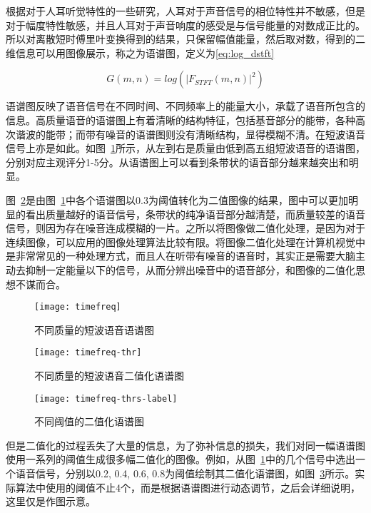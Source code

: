 根据对于人耳听觉特性的一些研究，人耳对于声音信号的相位特性并不敏感，但是对于幅度特性敏感，并且人耳对于声音响度的感受是与信号能量的对数成正比的。所以对离散短时傅里叶变换得到的结果，只保留幅值能量，然后取对数，得到的二维信息可以用图像展示，称之为语谱图，定义为\ref{eq:log_dstft}

\begin{equation}\label{eq:log_dstft}
G(m, n) = log(|F_{STFT}(m, n)|^2)
\end{equation}

语谱图反映了语音信号在不同时间、不同频率上的能量大小，承载了语音所包含的信息。高质量语音的语谱图上有着清晰的结构特征，包括基音部分的能带，各种高次谐波的能带；而带有噪音的语谱图则没有清晰结构，显得模糊不清。在短波语音信号上亦是如此。如图~\ref{fig:timefreq}所示，从左到右是质量由低到高五组短波语音的语谱图，分别对应主观评分1-5分。从语谱图上可以看到条带状的语音部分越来越突出和明显。

图~\ref{fig:timefreq-thr0.3}是由图~\ref{fig:timefreq}中各个语谱图以0.3为阈值转化为二值图像的结果，图中可以更加明显的看出质量越好的语音信号，条带状的纯净语音部分越清楚，而质量较差的语音信号，则因为存在噪音连成模糊的一片。之所以将图像做二值化处理，是因为对于连续图像，可以应用的图像处理算法比较有限。将图像二值化处理在计算机视觉中是非常常见的一种处理方式，而且人在听带有噪音的语音时，其实正是需要大脑主动去抑制一定能量以下的信号，从而分辨出噪音中的语音部分，和图像的二值化思想不谋而合。

\begin{figure}
\centering
\texttt{[image: timefreq]}
\caption{不同质量的短波语音语谱图\label{fig:timefreq}}
\end{figure}

\begin{figure}
\centering
\texttt{[image: timefreq-thr]}
\caption{不同质量的短波语音二值化语谱图\label{fig:timefreq-thr0.3}}
\end{figure}

\begin{figure}
\centering
\texttt{[image: timefreq-thrs-label]}
\caption{不同阈值的二值化语谱图\label{fig:timefreq-thrs-label}}
\end{figure}

但是二值化的过程丢失了大量的信息，为了弥补信息的损失，我们对同一幅语谱图使用一系列的阈值生成很多幅二值化的图像。例如，从图~\ref{fig:timefreq}中的几个信号中选出一个语音信号，分别以0.2, 0.4, 0.6, 0.8为阈值绘制其二值化语谱图，如图~\ref{fig:timefreq-thrs-label}所示。实际算法中使用的阈值不止4个，而是根据语谱图进行动态调节，之后会详细说明，这里仅是作图示意。

